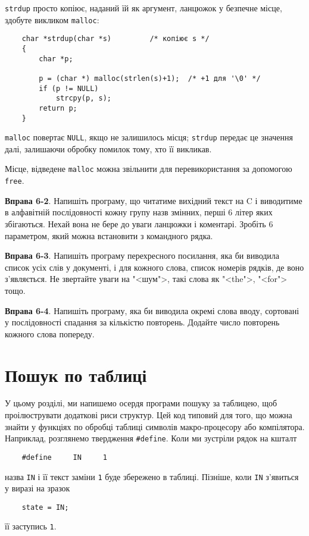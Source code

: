 \documentclass[a4paper,12pt]{book}
\begin{document}
  \texttt{strdup} просто копіює, наданий їй як аргумент, ланцюжок у безпечне місце,
  здобуте викликом \texttt{malloc}:
  \begin{verbatim}
    char *strdup(char *s)         /* копіює s */
    {
        char *p;

        p = (char *) malloc(strlen(s)+1);  /* +1 для '\0' */
        if (p != NULL)
            strcpy(p, s);
        return p;
    }
  \end{verbatim}

  \texttt{malloc} повертає \texttt{NULL}, якщо не залишилось місця; \texttt{strdup}
  передає це значення далі, залишаючи обробку помилок тому, хто її викликав.

  Місце, відведене \texttt{malloc} можна звільнити для перевикористання за допомогою
  \texttt{free}.

  \textbf{Вправа 6-2}. Напишіть програму, що читатиме вихідний текст на C і виводитиме в
  алфавітній послідовності кожну групу назв змінних, перші 6 літер яких збігаються. Нехай
  вона не бере до уваги ланцюжки і коментарі. Зробіть 6 параметром, який можна встановити
  з командного рядка.

  \textbf{Вправа 6-3}. Напишіть програму перехресного посилання, яка би виводила список усіх
  слів у документі, і для кожного слова, список номерів рядків, де воно з'являється. Не
  звертайте уваги на "<шум">, такі слова як "<the">, "<for">
  тощо.

  \textbf{Вправа 6-4}. Напишіть програму, яка би виводила окремі слова вводу, сортовані у
  послідовності спадання за кількістю повторень. Додайте число повторень кожного слова
  попереду.

\section{Пошук по таблиці}

\label{f0:ch6.6}
  У цьому розділі, ми напишемо осердя програми пошуку за таблицею, щоб проілюструвати
  додаткові риси структур. Цей код типовий для того, що можна знайти у функціях по обробці
  таблиці символів макро-процесору або компілятора. Наприклад, розглянемо твердження
  \texttt{\#define}. Коли ми зустріли рядок на кшталт
  \begin{verbatim}
    #define     IN     1
  \end{verbatim}
  назва \texttt{IN} і її текст заміни \texttt{1} буде збережено в таблиці. Пізніше, коли
  \texttt{IN} з'явиться у виразі на зразок
  \begin{verbatim}
    state = IN;
  \end{verbatim}
  її заступись \texttt{1}.
\end{document}
